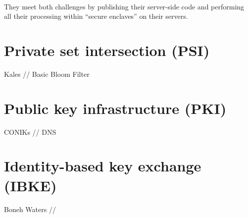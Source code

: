 \paragraph{} They meet both challenges by publishing their server-side code and performing all their processing within ``secure enclaves'' on their servers.


\section{Private set intersection (PSI)}
\label{sec:PSI}

Kales // Basic Bloom Filter



\section{Public key infrastructure (PKI)}
\label{sec:PKI}

CONIKs // DNS

\section{Identity-based key exchange (IBKE)}
\label{sec:IBKE}

Boneh Waters // 